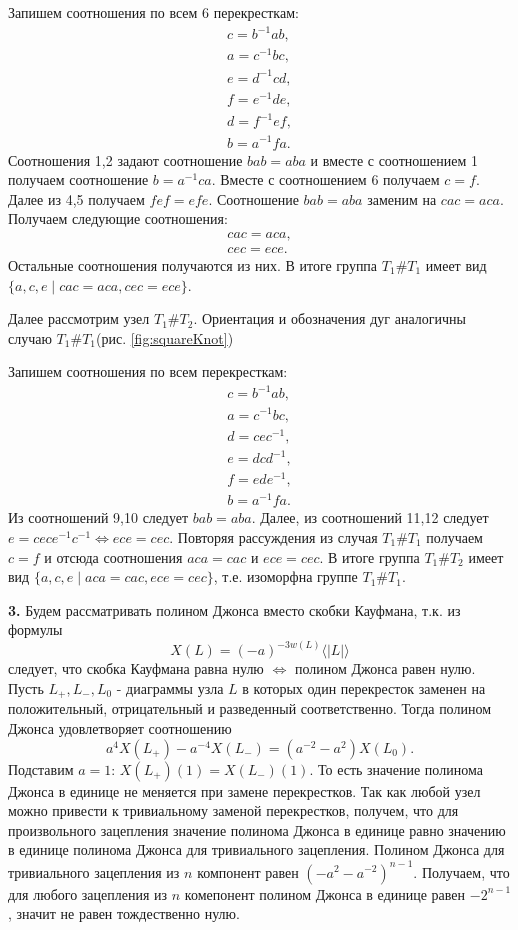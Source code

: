 \documentclass[a4paper]{article}
\begin{document}
Запишем соотношения по всем \( 6 \) перекресткам:
\begin{gather}
  c = b^{-1}ab,\\
  a = c^{-1}bc,\\
  e = d^{-1}cd,\\
  f = e^{-1}de,\\
  d = f^{-1}ef,\\
  b = a^{-1}fa.
\end{gather}
Соотношения 1,2 задают соотношение \( bab=aba \) и вместе с
соотношением 1 получаем соотношение \( b = a^{-1}ca \). Вместе с
соотношением 6 получаем \( c = f \). Далее из 4,5 получаем \( fef =
efe \). Соотношение \( bab=aba \) заменим на \( cac = aca \).\\
Получаем следующие соотношения:
\begin{gather}
  cac = aca,\\
  cec = ece.
\end{gather}
Остальные соотношения получаются из них. В итоге группа \( T_1 \# T_1
\) имеет вид \( \{a,c,e \mid cac = aca, cec = ece\} \).

Далее рассмотрим узел \( T_1 \# T_2 \). Ориентация и обозначения дуг
аналогичны случаю \( T_1 \# T_1 \)(рис. \ref{fig:squareKnot})

Запишем соотношения по всем перекресткам:
\begin{gather}
  c = b^{-1}ab,\\
  a = c^{-1}bc,\\
  d = cec^{-1},\\
  e = dcd^{-1},\\
  f = ede^{-1},\\
  b = a^{-1}fa.
\end{gather}
Из соотношений 9,10 следует \( bab = aba \). Далее, из соотношений
11,12 следует \( e = cece^{-1}c^{-1} \iff ece = cec\).
Повторяя рассуждения из случая \( T_1 \# T_1 \) получаем \( c=f \) и
отсюда соотношения \( aca = cac \) и \( ece = cec \).
В итоге группа \( T_1 \# T_2
\) имеет вид \( \{a,c,e \mid aca = cac, ece = cec\} \), т.е.
изоморфна группе \( T_1 \# T_1 \).

\textbf{3.} Будем рассматривать полином Джонса вместо скобки
Кауфмана, т.к. из формулы
\[
  X(L) = (-a)^{-3w(L)}\langle | L |\rangle
\]
следует, что скобка Кауфмана равна нулю \( \iff \) полином Джонса
равен нулю. Пусть \( L_+, L_-, L_0 \) - диаграммы узла \( L \) в
которых один перекресток заменен на положительный, отрицательный и
разведенный соответственно. Тогда полином Джонса удовлетворяет соотношению
\[
  a^4 X(L_+) - a^{-4}X(L_-) = (a^{-2} - a^2)X(L_0).
\]
Подставим \( a=1 \): \( X(L_+)(1) =  X(L_-)(1) \). То есть значение
полинома Джонса в единице не меняется при замене перекрестков. Так
как любой узел можно привести к тривиальному заменой перекрестков,
получем, что для произвольного зацепления значение полинома Джонса в
единице равно значению в единице полинома Джонса для тривиального зацепления.
Полином Джонса для тривиального зацепления из \( n \) компонент равен
\((-a^2 - a^{-2})^{n-1}  \). Получаем, что для любого зацепления из
\( n \) комепонент полином Джонса в единице равен \( -2^{n-1} \),
значит не равен тождественно нулю.
\end{document}
